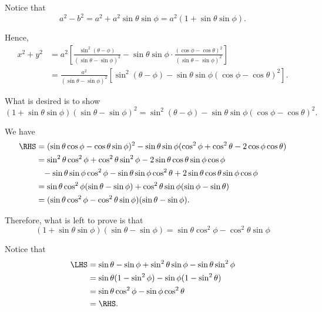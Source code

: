 \begin{enumerate}
          Notice that
          \[
              a^2 - b^2 = a^2 + a^2 \sin \theta \sin \phi = a^2 (1 + \sin \theta \sin \phi).
          \]

          Hence,
          \begin{align*}
              x^2 + y^2 & = a^2 \left[\frac{\sin^2 (\theta - \phi)}{\left(\sin \theta - \sin \phi\right)^2} - \sin \theta \sin \phi \cdot \frac{\left(\cos \phi - \cos \theta\right)^2}{\left(\sin \theta - \sin \phi\right)^2}\right] \\
                        & =\frac{a^2}{(\sin \theta - \sin \phi)^2} \left[\sin^2 (\theta - \phi) - \sin \theta \sin \phi \left(\cos \phi - \cos \theta\right)^2\right].
          \end{align*}

          What is desired is to show
          \[
              (1 + \sin \theta \sin \phi) (\sin \theta - \sin \phi)^2 = \sin^2 (\theta - \phi) - \sin \theta \sin \phi \left(\cos \phi - \cos \theta\right)^2.
          \]

          We have
          \begin{align*}
              \RHS & = (\sin \theta \cos \phi - \cos \theta \sin \phi)^2 - \sin \theta \sin \phi (\cos^2 \phi + \cos^2 \theta - 2 \cos \phi \cos \theta)    \\
                   & = \sin^2 \theta \cos^2 \phi + \cos^2 \theta \sin^2 \phi - 2 \sin \theta \cos \theta \sin \phi \cos \phi                                \\
                   & \phantom{=} - \sin \theta \sin \phi \cos^2 \phi - \sin \theta \sin \phi \cos^2 \theta  + 2 \sin \theta \cos \theta \sin \phi \cos \phi \\
                   & = \sin\theta \cos^2\phi (\sin \theta - \sin \phi) + \cos^2 \theta \sin \phi (\sin \phi - \sin \theta)                                  \\
                   & = (\sin\theta \cos^2 \phi - \cos^2 \theta \sin \phi) (\sin \theta - \sin \phi).
          \end{align*}

          Therefore, what is left to prove is that
          \[
              (1 + \sin \theta \sin \phi)(\sin \theta - \sin \phi) = \sin\theta \cos^2 \phi - \cos^2 \theta \sin \phi
          \]

          Notice that
          \begin{align*}
              \LHS & = \sin \theta - \sin \phi + \sin^2 \theta \sin \phi - \sin \theta \sin^2 \phi \\
                   & = \sin \theta (1 - \sin^2 \phi) - \sin \phi (1 - \sin^2 \theta)               \\
                   & = \sin \theta \cos^2 \phi - \sin \phi \cos^2 \theta                           \\
                   & = \RHS.
          \end{align*}


\end{enumerate}
